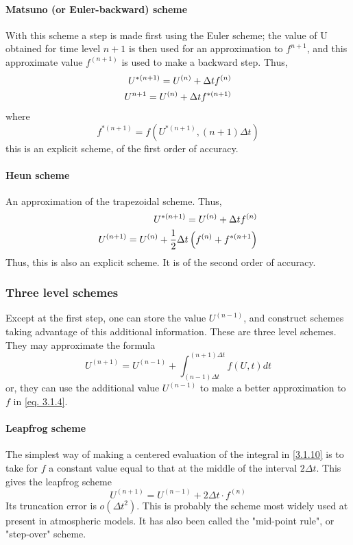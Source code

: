 \paragraph{Matsuno (or Euler-backward) scheme}
With this scheme a step is made first using the Euler scheme; the value of U obtained for time level $n+1$ is then used for an approximation to $f^{n+1}$, and this approximate value $f^{(n+1)}$ is used to make a backward step. Thus, 
\begin{align}\label{3.1.8}
    U^{*(n+1)}=U^{(n)}+\Delta tf^{(n)} \\
    U^{n+1}=U^{(n)}+\Delta  tf^{*(n+1)}\notag
\end{align}
where
$$f^{*(n+1)}=f\left(U^{*(n+1)}, (n+1)\Delta t\right)$$
this is an explicit scheme, of the first order of accuracy.
\paragraph{Heun scheme}
An approximation of the trapezoidal scheme. Thus, 
\begin{align}
    U^{*(n+1)}=U^{(n)}+\Delta t f^{(n)} \\
    U^{(n+1)}=U^{(n)}+\frac{1}{2}\Delta t \left(f^{(n)}+f^{*(n+1}\right) \notag
\end{align}
Thus, this is also an explicit scheme. It is of the second order of accuracy.
\subsubsection{Three level schemes}
Except at the first step, one can store the value $U^{(n-1)}$, and construct schemes taking advantage of this additional information. These are three level schemes. They may approximate the formula
\begin{equation}\label{3.1.10}
    U^{(n+1)}=U^{(n-1)}+\int_{(n-1)\Delta t}^{(n+1)\Delta t}f(U,t)dt
\end{equation}
or, they can use the additional value $U^{(n-1)}$ to make a better approximation to $f$ in \ref{eq. 3.1.4}.
\paragraph{Leapfrog scheme}
The simplest way of making a centered evaluation of the integral in \ref{3.1.10} is to take for $f$ a constant value equal to that at the middle of the interval $2\Delta t$. This gives the leapfrog scheme
\begin{equation}\label{3.1.11}
    U^{(n+1)}=U^{(n-1)}+2\Delta t\cdot f^{(n)}
\end{equation}
Its truncation error is $o(\Delta t^2)$. This is probably the scheme most widely used at present in atmospheric models. It has also been called the "mid-point rule", or "step-over" scheme.
